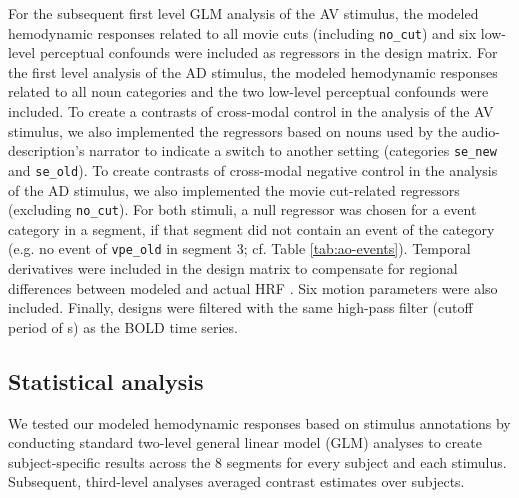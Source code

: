 \documentclass[english]{article}
\begin{document}
For the subsequent first level GLM analysis of the AV stimulus, the modeled
hemodynamic responses related to all movie cuts (including \texttt{no\_cut}) and
six low-level perceptual confounds were included as regressors in the design
matrix.
For the first level analysis of the AD stimulus, the modeled hemodynamic
responses related to all noun categories and the two low-level perceptual
confounds were included.
To create a contrasts of cross-modal control in the analysis of the AV stimulus,
we also implemented the regressors based on nouns used by the
audio-description's narrator to indicate a switch to another setting (categories
\texttt{se\_new} and \texttt{se\_old}).
To create contrasts of cross-modal negative control in the analysis of the AD
stimulus, we also implemented the movie cut-related regressors
(excluding \texttt{no\_cut}).
For both stimuli, a null regressor was chosen for a event category in a segment,
if that segment did not contain an event of the category (e.g. no event of
\texttt{vpe\_old} in segment 3; cf. Table \ref{tab:ao-events}).
Temporal derivatives were included in the design matrix to compensate for
regional differences between modeled and actual HRF \citep{friston1998event}.
Six motion parameters were also included.
Finally, designs were filtered with the same high-pass filter (cutoff period of
\unit[150]{s}) as the BOLD time series.


\subsection{Statistical analysis}

We tested our modeled hemodynamic responses based on stimulus annotations by
conducting standard two-level general linear model (GLM) analyses to create
subject-specific results across the 8 segments for every subject and each
stimulus.
Subsequent, third-level analyses averaged contrast estimates over subjects.
\end{document}
